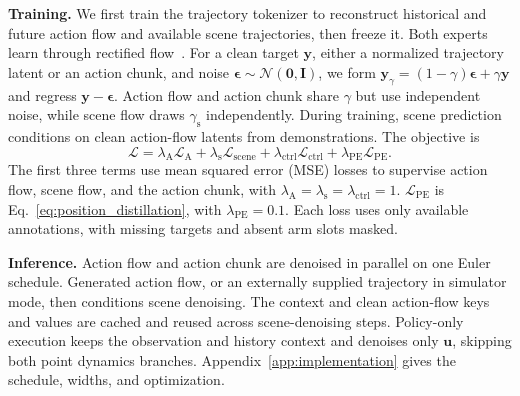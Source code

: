\noindent\textbf{Training.}
We first train the trajectory tokenizer to reconstruct historical and
future action flow and available scene trajectories, then freeze it.
Both experts learn through rectified flow~\citep{liu2022rectifiedflow}.
For a clean target $\mathbf y$, either a normalized trajectory latent or
an action chunk, and noise
$\boldsymbol\epsilon\sim\mathcal N(\mathbf 0,\mathbf I)$, we form
$\mathbf y_\gamma=(1-\gamma)\boldsymbol\epsilon+\gamma\mathbf y$ and
regress $\mathbf y-\boldsymbol\epsilon$.
Action flow and action chunk share $\gamma$ but use independent noise, while scene
flow draws $\gamma_{\mathrm s}$ independently.
During training, scene prediction conditions on clean action-flow latents
from demonstrations. The objective is
\begin{equation}
    \mathcal L
    =\lambda_{\mathrm A}\mathcal L_{\mathrm A}
    +\lambda_{\mathrm s}\mathcal L_{\mathrm{scene}}
    +\lambda_{\mathrm{ctrl}}\mathcal L_{\mathrm{ctrl}}
    +\lambda_{\mathrm{PE}}\mathcal L_{\mathrm{PE}}.
    \label{eq:training_objective}
\end{equation}
The first three terms use mean squared error (MSE) losses to supervise
action flow, scene flow, and the action chunk, with
$\lambda_{\mathrm A}=\lambda_{\mathrm s}=\lambda_{\mathrm{ctrl}}=1$.
$\mathcal L_{\mathrm{PE}}$ is Eq.~\ref{eq:position_distillation}, with
$\lambda_{\mathrm{PE}}=0.1$.
Each loss uses only available annotations, with missing targets and
absent arm slots masked.

\noindent\textbf{Inference.}
Action flow and action chunk are denoised in parallel on one Euler schedule.
Generated action flow, or an externally supplied trajectory in simulator
mode, then conditions scene denoising.
The context and clean action-flow keys and values are cached and reused
across scene-denoising steps.
Policy-only execution keeps the observation and history context and
denoises only $\mathbf u$, skipping both point dynamics branches.
Appendix~\ref{app:implementation} gives the schedule, widths, and
optimization.
